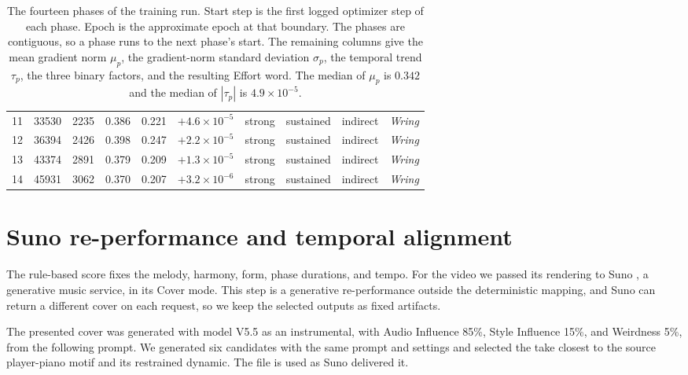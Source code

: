 \begin{table}[t]
\begin{tabular}{rrrrrrllll}
    11 & 33530 & 2235 & 0.386 & 0.221 & $+4.6\times10^{-5}$ & strong & sustained & indirect & \textit{Wring} \\
    12 & 36394 & 2426 & 0.398 & 0.247 & $+2.2\times10^{-5}$ & strong & sustained & indirect & \textit{Wring} \\
    13 & 43374 & 2891 & 0.379 & 0.209 & $+1.3\times10^{-5}$ & strong & sustained & indirect & \textit{Wring} \\
    14 & 45931 & 3062 & 0.370 & 0.207 & $+3.2\times10^{-6}$ & strong & sustained & indirect & \textit{Wring} \\
    \hline
  \end{tabular}
  \caption{The fourteen phases of the training run. Start step is the first
  logged optimizer step of each phase. Epoch is the approximate epoch at
  that boundary. The phases are contiguous, so a phase runs to the next phase's
  start. The remaining columns give the mean gradient norm $\mu_p$, the
  gradient-norm standard deviation $\sigma_p$, the temporal trend $\tau_p$, the
  three binary factors, and the resulting Effort word. The median of $\mu_p$ is $0.342$ and the median
  of $|\tau_p|$ is $4.9\times10^{-5}$.}
  \label{tab:phases}
\end{table}

\section{Suno re-performance and temporal alignment}

The rule-based score fixes the melody, harmony, form, phase durations, and tempo.
For the video we passed its rendering to Suno \citep{suno2026}, a generative music service, in its Cover mode.
This step is a generative re-performance outside the deterministic mapping, and Suno can return a different cover on each request, so we keep the selected outputs as fixed artifacts.

The presented cover was generated with model V5.5 as an instrumental, with Audio Influence 85\%, Style Influence 15\%, and Weirdness 5\%, from the following prompt.
We generated six candidates with the same prompt and settings and selected the take closest to the source player-piano motif and its restrained dynamic.
The file is used as Suno delivered it.

